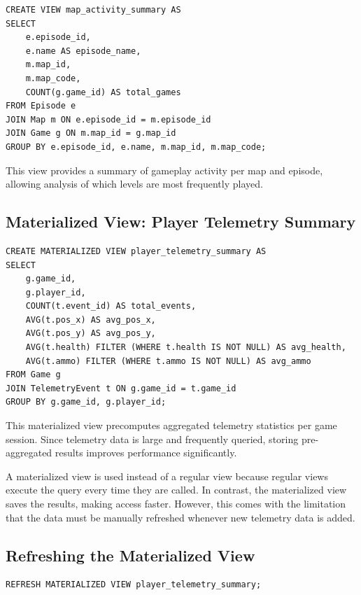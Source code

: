 \documentclass[11pt]{article}
\begin{document}
\begin{lstlisting}[style=sqlstyle]
CREATE VIEW map_activity_summary AS
SELECT
    e.episode_id,
    e.name AS episode_name,
    m.map_id,
    m.map_code,
    COUNT(g.game_id) AS total_games
FROM Episode e
JOIN Map m ON e.episode_id = m.episode_id
JOIN Game g ON m.map_id = g.map_id
GROUP BY e.episode_id, e.name, m.map_id, m.map_code;
\end{lstlisting}

This view provides a summary of gameplay activity per map and episode, allowing analysis of which levels are most frequently played.

\bigskip

\subsection{Materialized View: Player Telemetry Summary}

\begin{lstlisting}[style=sqlstyle]
CREATE MATERIALIZED VIEW player_telemetry_summary AS
SELECT
    g.game_id,
    g.player_id,
    COUNT(t.event_id) AS total_events,
    AVG(t.pos_x) AS avg_pos_x,
    AVG(t.pos_y) AS avg_pos_y,
    AVG(t.health) FILTER (WHERE t.health IS NOT NULL) AS avg_health,
    AVG(t.ammo) FILTER (WHERE t.ammo IS NOT NULL) AS avg_ammo
FROM Game g
JOIN TelemetryEvent t ON g.game_id = t.game_id
GROUP BY g.game_id, g.player_id;
\end{lstlisting}

This materialized view precomputes aggregated telemetry statistics per game session. Since telemetry data is large and frequently queried, storing pre-aggregated results improves performance significantly.

A materialized view is used instead of a regular view because regular views execute the query every time they are called. In contrast, the materialized view saves the results, making access faster. However, this comes with the limitation that the data must be manually refreshed whenever new telemetry data is added.

\subsection{Refreshing the Materialized View}

\begin{lstlisting}[style=sqlstyle]
REFRESH MATERIALIZED VIEW player_telemetry_summary;
\end{lstlisting}
\end{document}

